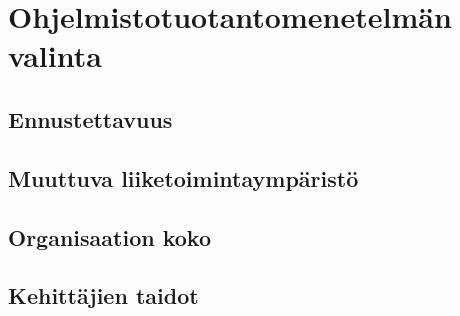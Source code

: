 \documentclass[finnish]{tktltiki2}
\theoremstyle{definition}
\theoremstyle{remark}
\begin{document}
\section{Ohjelmistotuotantomenetelmän valinta}

\subsection{Ennustettavuus}

\subsection{Muuttuva liiketoimintaympäristö}

\subsection{Organisaation koko}

\subsection{Kehittäjien taidot}

\subsection{}

\section{}

\section{}


%
%
% 
%



\end{document}
